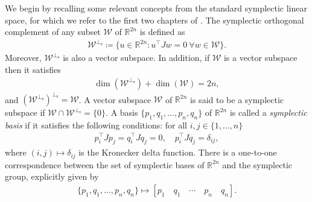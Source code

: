 \documentclass[preprint,12pt]{elsarticle}
\begin{document}
    We begin by recalling some relevant concepts from the standard symplectic linear space, for which we refer to the first two chapters of \cite{degosson}.
    The {symplectic orthogonal complement} of any subset $\mathscr{W}$ of $\mathds{R}^{2n}$ is defined as
    \begin{align}
        \mathscr{W}^{\perp_{\operatorname{s}}} \coloneqq \big\{u \in \mathds{R}^{2n}: u^\top J w=0 \ \forall w \in \mathscr{W} \big\}.
    \end{align}
    Moreover, $\mathscr{W}^{\perp_{\operatorname{s}}}$ is also a vector subspace.
    In addition, if $\mathscr{W}$ is a vector subspace then it satisfies
    \begin{align}
        \operatorname{dim}\left(\mathscr{W}^{\perp_{\operatorname{s}}}\right)+\operatorname{dim}\left(\mathscr{W}\right)= 2n,
    \end{align}
    and $\left(\mathscr{W}^{\perp_{\operatorname{s}}}\right)^{\perp_{\operatorname{s}}}=\mathscr{W}$.
    A vector subspace $\mathscr{W}$ of $\mathds{R}^{2n}$ is said to be a symplectic subspace if $\mathscr{W} \cap \mathscr{W}^{\perp_{\operatorname{s}}} = \{0\}$. 
    A basis $\{p_1, q_1,\ldots, p_n, q_n\}$ of $\mathds{R}^{2n}$ is called a \emph{symplectic basis} if it satisfies the following conditions: for all $i,j \in \{1,\ldots, n\}$
    \begin{align}
        p_i^\top J p_j= q_i^\top J q_j=0, \quad  p_i^\top J q_j=\delta_{ij},
    \end{align}
    where $(i,j) \mapsto \delta_{ij}$ is the Kronecker delta function.
    There is a one-to-one correspondence between the set of symplectic bases of $\mathds{R}^{2n}$ and the symplectic group, explicitly given by
   \begin{align}
       \{p_1, q_1,\ldots, p_n, q_n\} \mapsto [p_1 \quad q_1 \quad \cdots \quad p_n \quad q_n].
   \end{align}
\end{document}
